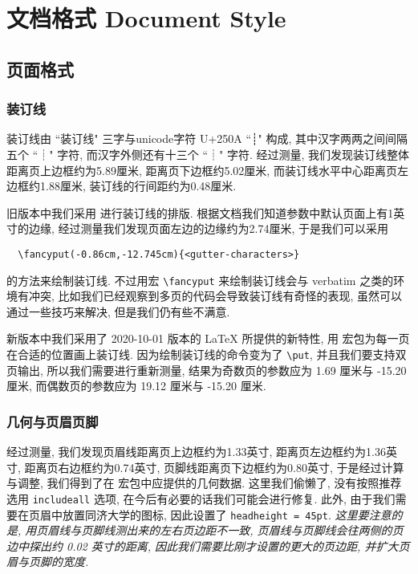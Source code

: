 
\section{文档格式 Document Style}

\subsection{页面格式}

\subsubsection{装订线}

装订线由 ``装订线" 三字与unicode字符 U+250A ``┊" 构成, 其中汉字两两之间间隔五个 ``┊" 字符, 而汉字外侧还有十三个 ``┊" 字符. 经过测量, 我们发现装订线整体距离页上边框约为5.89厘米, 距离页下边框约5.02厘米, 而装订线水平中心距离页左边框约1.88厘米, 装订线的行间距约为0.48厘米.

旧版本中我们采用  进行装订线的排版. 根据文档我们知道参数中默认页面上有1英寸的边缘, 经过测量我们发现页面左边的边缘约为2.74厘米, 于是我们可以采用
\begin{verbatim}
  \fancyput(-0.86cm,-12.745cm){<gutter-characters>}
\end{verbatim}
的方法来绘制装订线. 不过用宏 \verb|\fancyput| 来绘制装订线会与 verbatim 之类的环境有冲突, 比如我们已经观察到多页的代码会导致装订线有奇怪的表现, 虽然可以通过一些技巧来解决, 但是我们仍有些不满意.

新版本中我们采用了 2020-10-01 版本的 {\LaTeX} 所提供的新特性, 用  宏包为每一页在合适的位置画上装订线. 因为绘制装订线的命令变为了 \verb|\put|, 并且我们要支持双页输出, 所以我们需要进行重新测量, 结果为奇数页的参数应为 1.69 厘米与 -15.20 厘米, 而偶数页的参数应为 19.12 厘米与 -15.20 厘米.

\subsubsection{几何与页眉页脚}

经过测量, 我们发现页眉线距离页上边框约为1.33英寸, 距离页左边框约为1.36英寸, 距离页右边框约为0.74英寸, 页脚线距离页下边框约为0.80英寸, 于是经过计算与调整, 我们得到了在  宏包中应提供的几何数据. 这里我们偷懒了, 没有按照推荐选用 \verb|includeall| 选项, 在今后有必要的话我们可能会进行修复. 此外, 由于我们需要在页眉中放置同济大学的图标, 因此设置了 \verb|headheight = 45pt|. \emph{这里要注意的是, 用页眉线与页脚线测出来的左右页边距不一致, 页眉线与页脚线会往两侧的页边中探出约 0.02 英寸的距离, 因此我们需要比刚才设置的更大的页边距, 并扩大页眉与页脚的宽度.}

